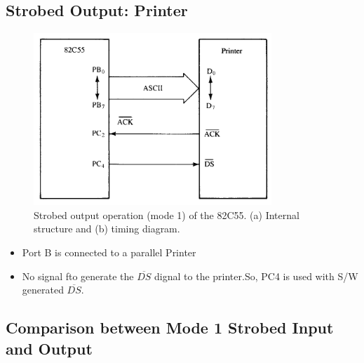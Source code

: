 \subsection{Strobed Output: Printer}

\begin{figure}[h!]
  \centering
  \includegraphics[width = 0.8\textwidth]{./figures/Strobed_Printer.png}
  \caption{Strobed output operation (mode 1) of the 82C55. (a) Internal structure and (b) timing diagram.}
\end{figure}
\begin{itemize}
  \item Port B is connected to a parallel Printer
  \item No signal fto generate the $\overline{DS}$ dignal to the printer.So, PC4 is used with S/W generated $\overline{DS}$.
\end{itemize}

\newpage
\subsection{Comparison between Mode 1 Strobed Input and Output}


